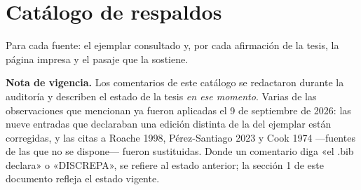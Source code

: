 \documentclass[11pt,a4paper]{article}
\begin{document}
\section{Catálogo de respaldos}
\noindent\small Para cada fuente: el ejemplar consultado y, por cada afirmación de la tesis, la página impresa y el pasaje que la sostiene.\par\vspace{5pt}
\begin{pasaje}\footnotesize\textbf{Nota de vigencia.} Los comentarios de este catálogo se redactaron durante la auditoría y describen el estado de la tesis \emph{en ese momento}. Varias de las observaciones que mencionan ya fueron aplicadas el 9 de septiembre de 2026: las nueve entradas que declaraban una edición distinta de la del ejemplar están corregidas, y las citas a Roache 1998, Pérez-Santiago 2023 y Cook 1974 —fuentes de las que no se dispone— fueron sustituidas. Donde un comentario diga «el .bib declara» o «DISCREPA», se refiere al estado anterior; la sección 1 de este documento refleja el estado vigente.\end{pasaje}
\end{document}
